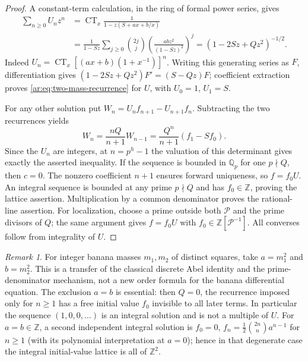 \documentclass[11pt,a4paper]{article}
\theoremstyle{definition}
\theoremstyle{remark}
\newtheorem{remark}[theorem]{Remark}
\numberwithin{equation}{section}
\begin{document}
\begin{proof}
A constant-term calculation, in the ring of formal power series, gives
\begin{align*}
 \sum_{n\ge0}U_nz^n
 &=\operatorname{CT}_x\frac1{1-z(S+ax+b/x)}\\
 &=\frac1{1-Sz}\sum_{j\ge0}\binom{2j}{j}
       \left(\frac{abz^2}{(1-Sz)^2}\right)^j
  =(1-2Sz+Qz^2)^{-1/2}.
\end{align*}
Indeed $U_n=\operatorname{CT}_x[(ax+b)(1+x^{-1})]^n$.
Writing this generating series as $F$, differentiation gives
$(1-2Sz+Qz^2)F'=(S-Qz)F$; coefficient extraction proves
\eqref{ar:eq:two-mass-recurrence} for $U$, with $U_0=1$, $U_1=S$.

For any other solution put $W_n=U_nf_{n+1}-U_{n+1}f_n$.
Subtracting the two recurrences yields
\[
 W_n=\frac{nQ}{n+1}W_{n-1}
     =\frac{Q^n}{n+1}(f_1-Sf_0).
\]
Since the $U_n$ are integers, at $n=p^h-1$ the valuation of this
determinant gives exactly the asserted inequality. If the sequence is
bounded in $\mathbb Q_p$ for one $p\nmid Q$, then $c=0$. The nonzero
coefficient $n+1$ ensures forward uniqueness, so $f=f_0U$.
An integral sequence is bounded at any prime $p\nmid Q$ and has
$f_0\in\mathbb Z$, proving the lattice assertion. Multiplication by a
common denominator proves the rational-line assertion. For localization,
choose a prime outside both $\mathcal P$ and the prime divisors of $Q$;
the same argument gives $f=f_0U$ with $f_0\in\mathbb Z[\mathcal P^{-1}]$.
All converses follow from integrality of $U$.
\end{proof}

\begin{remark}
For integer banana masses $m_1,m_2$ of distinct squares, take
$a=m_1^2$ and $b=m_2^2$. This is a transfer of the classical discrete
Abel identity and the prime-denominator mechanism, not a new order
formula for the banana differential equation. The exclusion $a=b$ is
essential: then $Q=0$, the recurrence imposed only for $n\ge1$ has a
free initial value $f_0$ invisible to all later terms. In particular the
sequence $(1,0,0,\ldots)$ is an integral solution and is not a multiple of
$U$. For $a=b\in\mathbb Z$, a second independent integral solution is
$f_0=0$, $f_n=\frac12\binom{2n}{n}a^{n-1}$ for $n\ge1$ (with its
polynomial interpretation at $a=0$); hence in that degenerate case the
integral initial-value lattice is all of $\mathbb Z^2$.
\end{remark}

\appendix
\end{document}
